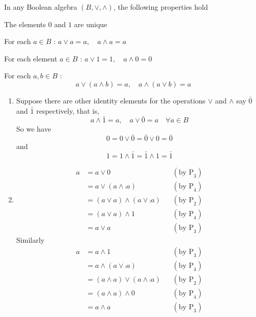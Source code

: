 \begin{theo}
    In any Boolean algebra \((B,\vee,\wedge)\), the following properties hold
    \begin{tasks}[label=$\mathrm{\arabic*.}$]
        \task The elements \(0\) and \(1\) are unique
        
        \task For each \(a\in B\) : \(a\vee a=a,\quad a\wedge a=a\)

        \task For each element \(a\in B\) : \(a\vee 1=1,\quad a\wedge 0=0\)

        \task For each \(a,b\in B\) :
        \[
        a\vee(a\wedge b)=a,\quad a\wedge(a\vee b)=a
        \]
    \end{tasks}
\end{theo}
\begin{myproof}
    \noindent
        \begin{enumerate}
            \item Suppose there are other identity elements for the operations \(\vee\) and \(\wedge\) say \(\bar{0}\) and \(\bar{1}\) respectively, that is,
            \[
            a\wedge\bar{1}=a,\quad a\vee\bar{0}=a\quad\forall a\in B
            \]
            So we have 
            \[  0=0\vee\bar{0}=\bar{0}\vee0=\bar{0}
            \]
            and
            \[1=1\wedge\bar{1}=\bar{1}\wedge1=\bar{1}
            \]

            \item 
            \begin{align*}
                a&=a\vee 0 && (\text{by P}_3)\\
                &=a\vee(a\wedge\comp{a}) && (\text{by P}_4)\\
                &=(a\vee a)\wedge(a\vee\comp{a}) && (\text{by P}_2)\\
                &=(a\vee a)\wedge 1 && (\text{by P}_4)\\
                &=a\vee a && (\text{by P}_3)
            \end{align*}
            Similarly 
            \begin{align*}
                a&=a\wedge1 && (\text{by P}_3)\\
                &=a\wedge(a\vee\comp{a}) && (\text{by P}_4)\\
                &=(a\wedge a)\vee(a\wedge\comp{a}) && (\text{by P}_2)\\
                &=(a\wedge a)\wedge 0 && (\text{by P}_4)\\
                &=a\wedge a && (\text{by P}_3)
            \end{align*}


\end{enumerate}
\end{myproof}
